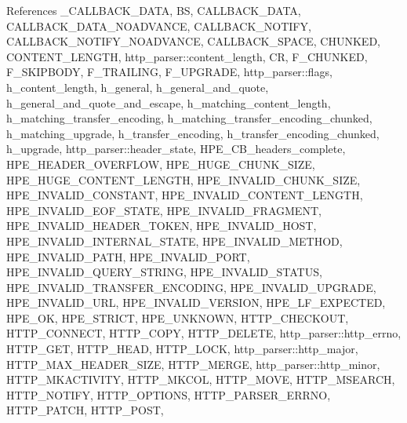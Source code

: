 References \+\_\+\+C\+A\+L\+L\+B\+A\+C\+K\+\_\+\+D\+A\+TA, BS, C\+A\+L\+L\+B\+A\+C\+K\+\_\+\+D\+A\+TA, C\+A\+L\+L\+B\+A\+C\+K\+\_\+\+D\+A\+T\+A\+\_\+\+N\+O\+A\+D\+V\+A\+N\+CE, C\+A\+L\+L\+B\+A\+C\+K\+\_\+\+N\+O\+T\+I\+FY, C\+A\+L\+L\+B\+A\+C\+K\+\_\+\+N\+O\+T\+I\+F\+Y\+\_\+\+N\+O\+A\+D\+V\+A\+N\+CE, C\+A\+L\+L\+B\+A\+C\+K\+\_\+\+S\+P\+A\+CE, C\+H\+U\+N\+K\+ED, C\+O\+N\+T\+E\+N\+T\+\_\+\+L\+E\+N\+G\+TH, http\+\_\+parser\+::content\+\_\+length, CR, F\+\_\+\+C\+H\+U\+N\+K\+ED, F\+\_\+\+S\+K\+I\+P\+B\+O\+DY, F\+\_\+\+T\+R\+A\+I\+L\+I\+NG, F\+\_\+\+U\+P\+G\+R\+A\+DE, http\+\_\+parser\+::flags, h\+\_\+content\+\_\+length, h\+\_\+general, h\+\_\+general\+\_\+and\+\_\+quote, h\+\_\+general\+\_\+and\+\_\+quote\+\_\+and\+\_\+escape, h\+\_\+matching\+\_\+content\+\_\+length, h\+\_\+matching\+\_\+transfer\+\_\+encoding, h\+\_\+matching\+\_\+transfer\+\_\+encoding\+\_\+chunked, h\+\_\+matching\+\_\+upgrade, h\+\_\+transfer\+\_\+encoding, h\+\_\+transfer\+\_\+encoding\+\_\+chunked, h\+\_\+upgrade, http\+\_\+parser\+::header\+\_\+state, H\+P\+E\+\_\+\+C\+B\+\_\+headers\+\_\+complete, H\+P\+E\+\_\+\+H\+E\+A\+D\+E\+R\+\_\+\+O\+V\+E\+R\+F\+L\+OW, H\+P\+E\+\_\+\+H\+U\+G\+E\+\_\+\+C\+H\+U\+N\+K\+\_\+\+S\+I\+ZE, H\+P\+E\+\_\+\+H\+U\+G\+E\+\_\+\+C\+O\+N\+T\+E\+N\+T\+\_\+\+L\+E\+N\+G\+TH, H\+P\+E\+\_\+\+I\+N\+V\+A\+L\+I\+D\+\_\+\+C\+H\+U\+N\+K\+\_\+\+S\+I\+ZE, H\+P\+E\+\_\+\+I\+N\+V\+A\+L\+I\+D\+\_\+\+C\+O\+N\+S\+T\+A\+NT, H\+P\+E\+\_\+\+I\+N\+V\+A\+L\+I\+D\+\_\+\+C\+O\+N\+T\+E\+N\+T\+\_\+\+L\+E\+N\+G\+TH, H\+P\+E\+\_\+\+I\+N\+V\+A\+L\+I\+D\+\_\+\+E\+O\+F\+\_\+\+S\+T\+A\+TE, H\+P\+E\+\_\+\+I\+N\+V\+A\+L\+I\+D\+\_\+\+F\+R\+A\+G\+M\+E\+NT, H\+P\+E\+\_\+\+I\+N\+V\+A\+L\+I\+D\+\_\+\+H\+E\+A\+D\+E\+R\+\_\+\+T\+O\+K\+EN, H\+P\+E\+\_\+\+I\+N\+V\+A\+L\+I\+D\+\_\+\+H\+O\+ST, H\+P\+E\+\_\+\+I\+N\+V\+A\+L\+I\+D\+\_\+\+I\+N\+T\+E\+R\+N\+A\+L\+\_\+\+S\+T\+A\+TE, H\+P\+E\+\_\+\+I\+N\+V\+A\+L\+I\+D\+\_\+\+M\+E\+T\+H\+OD, H\+P\+E\+\_\+\+I\+N\+V\+A\+L\+I\+D\+\_\+\+P\+A\+TH, H\+P\+E\+\_\+\+I\+N\+V\+A\+L\+I\+D\+\_\+\+P\+O\+RT, H\+P\+E\+\_\+\+I\+N\+V\+A\+L\+I\+D\+\_\+\+Q\+U\+E\+R\+Y\+\_\+\+S\+T\+R\+I\+NG, H\+P\+E\+\_\+\+I\+N\+V\+A\+L\+I\+D\+\_\+\+S\+T\+A\+T\+US, H\+P\+E\+\_\+\+I\+N\+V\+A\+L\+I\+D\+\_\+\+T\+R\+A\+N\+S\+F\+E\+R\+\_\+\+E\+N\+C\+O\+D\+I\+NG, H\+P\+E\+\_\+\+I\+N\+V\+A\+L\+I\+D\+\_\+\+U\+P\+G\+R\+A\+DE, H\+P\+E\+\_\+\+I\+N\+V\+A\+L\+I\+D\+\_\+\+U\+RL, H\+P\+E\+\_\+\+I\+N\+V\+A\+L\+I\+D\+\_\+\+V\+E\+R\+S\+I\+ON, H\+P\+E\+\_\+\+L\+F\+\_\+\+E\+X\+P\+E\+C\+T\+ED, H\+P\+E\+\_\+\+OK, H\+P\+E\+\_\+\+S\+T\+R\+I\+CT, H\+P\+E\+\_\+\+U\+N\+K\+N\+O\+WN, H\+T\+T\+P\+\_\+\+C\+H\+E\+C\+K\+O\+UT, H\+T\+T\+P\+\_\+\+C\+O\+N\+N\+E\+CT, H\+T\+T\+P\+\_\+\+C\+O\+PY, H\+T\+T\+P\+\_\+\+D\+E\+L\+E\+TE, http\+\_\+parser\+::http\+\_\+errno, H\+T\+T\+P\+\_\+\+G\+ET, H\+T\+T\+P\+\_\+\+H\+E\+AD, H\+T\+T\+P\+\_\+\+L\+O\+CK, http\+\_\+parser\+::http\+\_\+major, H\+T\+T\+P\+\_\+\+M\+A\+X\+\_\+\+H\+E\+A\+D\+E\+R\+\_\+\+S\+I\+ZE, H\+T\+T\+P\+\_\+\+M\+E\+R\+GE, http\+\_\+parser\+::http\+\_\+minor, H\+T\+T\+P\+\_\+\+M\+K\+A\+C\+T\+I\+V\+I\+TY, H\+T\+T\+P\+\_\+\+M\+K\+C\+OL, H\+T\+T\+P\+\_\+\+M\+O\+VE, H\+T\+T\+P\+\_\+\+M\+S\+E\+A\+R\+CH, H\+T\+T\+P\+\_\+\+N\+O\+T\+I\+FY, H\+T\+T\+P\+\_\+\+O\+P\+T\+I\+O\+NS, H\+T\+T\+P\+\_\+\+P\+A\+R\+S\+E\+R\+\_\+\+E\+R\+R\+NO, H\+T\+T\+P\+\_\+\+P\+A\+T\+CH, H\+T\+T\+P\+\_\+\+P\+O\+ST, 